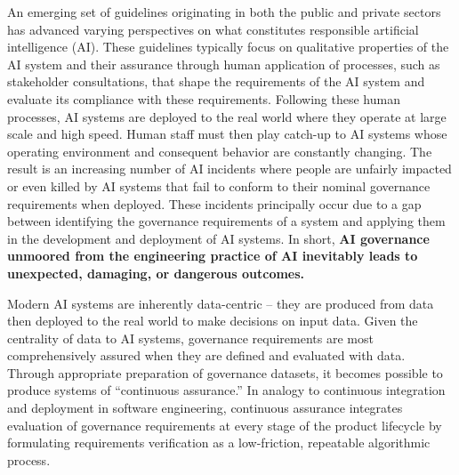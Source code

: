 
An emerging set of guidelines originating in both the public \cite{office_of_the_director_of_national_intelligence_artificial_2022,jared_dunnmon_responsible_2021,erin_mulvaney_nyc_2021,information_commisioners_office_guidance_2022,european_union_ai_2021} and private sectors \cite{google_building_2022,ibm_ai_2022,mokander_operationalising_2022} has advanced varying perspectives on what constitutes responsible artificial intelligence (AI). These guidelines typically focus on qualitative properties of the AI system and their assurance through human application of processes, such as stakeholder consultations, that shape the requirements of the AI system and evaluate its compliance with these requirements. Following these human processes, AI systems are deployed to the real world where they operate at large scale and high speed. Human staff must then play catch-up to AI systems whose operating environment and consequent behavior are constantly changing. The result is an increasing number of AI incidents \cite{mcgregor_indexing_2022,mcgregor_preventing_2021} where people are unfairly impacted or even killed by AI systems that fail to conform to their nominal governance requirements when deployed. These incidents principally occur due to a gap between identifying the governance requirements of a system and applying them in the development and deployment of AI systems. In short, \textbf{AI governance unmoored from the engineering practice of AI inevitably leads to unexpected, damaging, or dangerous outcomes.}


Modern AI systems are inherently data-centric -- they are produced from data then deployed to the real world to make decisions on input data. Given the centrality of data to AI systems, governance requirements are most comprehensively assured when they are defined and evaluated with data. Through appropriate preparation of governance datasets, it becomes possible to produce systems of ``continuous assurance.'' In analogy to continuous integration and deployment in software engineering, continuous assurance integrates evaluation of governance requirements at every stage of the product lifecycle by formulating requirements verification as a low-friction, repeatable algorithmic process.

